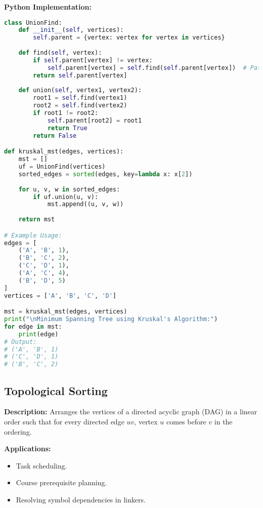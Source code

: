 \textbf{Python Implementation:}

\begin{lstlisting}[language=Python, xleftmargin=0.02\textwidth, xrightmargin=0.02\textwidth]
class UnionFind:
    def __init__(self, vertices):
        self.parent = {vertex: vertex for vertex in vertices}
    
    def find(self, vertex):
        if self.parent[vertex] != vertex:
            self.parent[vertex] = self.find(self.parent[vertex])  # Path compression
        return self.parent[vertex]
    
    def union(self, vertex1, vertex2):
        root1 = self.find(vertex1)
        root2 = self.find(vertex2)
        if root1 != root2:
            self.parent[root2] = root1
            return True
        return False

def kruskal_mst(edges, vertices):
    mst = []
    uf = UnionFind(vertices)
    sorted_edges = sorted(edges, key=lambda x: x[2])
    
    for u, v, w in sorted_edges:
        if uf.union(u, v):
            mst.append((u, v, w))
    
    return mst

# Example Usage:
edges = [
    ('A', 'B', 1),
    ('B', 'C', 2),
    ('C', 'D', 1),
    ('A', 'C', 4),
    ('B', 'D', 5)
]
vertices = ['A', 'B', 'C', 'D']

mst = kruskal_mst(edges, vertices)
print("\nMinimum Spanning Tree using Kruskal's Algorithm:")
for edge in mst:
    print(edge)
# Output:
# ('A', 'B', 1)
# ('C', 'D', 1)
# ('B', 'C', 2)
\end{lstlisting}

\subsection{Topological Sorting}

\textbf{Description:}  
Arranges the vertices of a directed acyclic graph (DAG) in a linear order such that for every directed edge \( uv \), vertex \( u \) comes before \( v \) in the ordering.

\textbf{Applications:}
\begin{itemize}
    \item Task scheduling.
    \item Course prerequisite planning.
    \item Resolving symbol dependencies in linkers.
\end{itemize}

